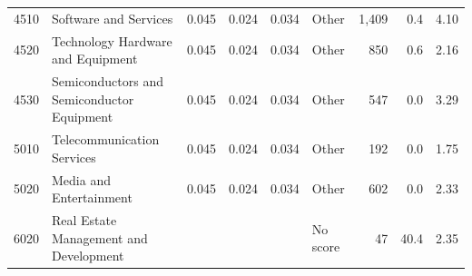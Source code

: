 \begin{tabular}{llrrrlrrr}
4510 & Software and Services & 0.045 & 0.024 & 0.034 & Other & 1,409 & 0.4 & 4.10 \\
4520 & Technology Hardware and Equipment & 0.045 & 0.024 & 0.034 & Other & 850 & 0.6 & 2.16 \\
4530 & Semiconductors and Semiconductor Equipment & 0.045 & 0.024 & 0.034 & Other & 547 & 0.0 & 3.29 \\
5010 & Telecommunication Services & 0.045 & 0.024 & 0.034 & Other & 192 & 0.0 & 1.75 \\
5020 & Media and Entertainment & 0.045 & 0.024 & 0.034 & Other & 602 & 0.0 & 2.33 \\
6020 & Real Estate Management and Development &  &  &  & No score & 47 & 40.4 & 2.35 \\
\bottomrule
\end{tabular}

